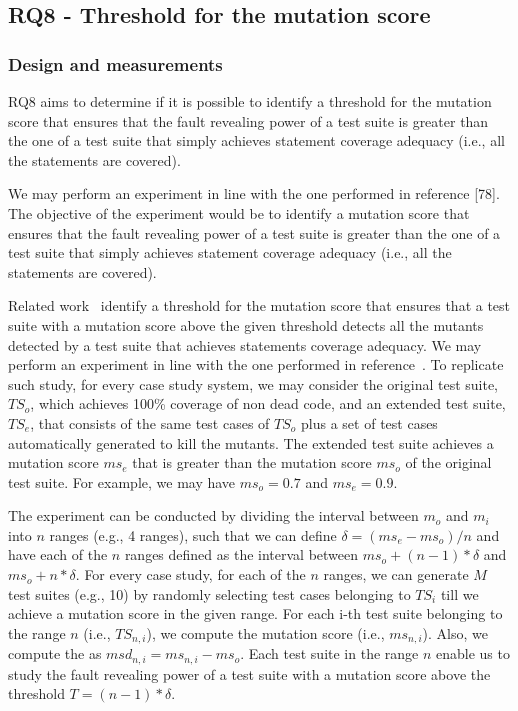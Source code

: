 




\clearpage
\subsection{RQ8 - Threshold for the mutation score}
\label{sec:exp:thr}
\subsubsection{Design and measurements}


RQ8 aims to determine if it is possible to identify a threshold for the mutation score that ensures that the fault revealing power of a test suite is greater than the one of a test suite that simply achieves statement coverage adequacy (i.e., all the statements are covered).


We may perform an experiment in line with the one performed in reference [78]. The objective of the experiment would be to identify a mutation score that ensures that the fault revealing power of a test suite is greater than the one of a test suite that simply achieves statement coverage adequacy (i.e., all the statements are covered). 

Related work~\cite{CChekam:17} identify a threshold for the mutation score that ensures that a test suite with a mutation score above the given threshold detects all the mutants detected by a test suite that achieves statements coverage adequacy. 
We may perform an experiment in line with the one performed in reference~\cite{CChekam:17}.
To replicate such study, for every case study system, we may consider the original test suite, $\mathit{TS}_o$, which achieves 100\% coverage of non dead code, and an extended test suite, $\mathit{TS}_e$, that consists of the same test cases of $\mathit{TS}_o$ plus a set of test cases automatically generated to kill the mutants. The extended test suite achieves a mutation score $ms_e$ that is greater than the mutation score $\mathit{ms}_o$ of the original test suite. For example, we may have $\mathit{ms}_o=0.7$ and $\mathit{ms}_e=0.9$.

The experiment can be conducted by dividing the interval between $m_o$ and $m_i$ into $n$ ranges (e.g., 4 ranges), such that we can define $\delta = (\mathit{ms}_e - \mathit{ms}_o)/n$ and have each of the $n$ ranges defined as the interval between $\mathit{ms}_o+(n-1)*\delta$ and $\mathit{ms}_o+n*\delta$.
For every case study, for each of the $n$ ranges, we can generate $M$ test suites  (e.g., 10) by randomly selecting test cases belonging to $\mathit{TS}_i$ till we achieve a mutation score in the given range.
For each i-th test suite belonging to the range $n$ (i.e., $\mathit{TS}_{n,i}$), we compute the mutation score (i.e., $ms_{n,i}$).
Also, we compute the  as $msd_{n,i}=ms_{n,i}-ms_o$. Each test suite in the range $n$ enable us to study the fault revealing power of a test suite with a mutation score above the threshold $T=(n-1)*\delta$.

